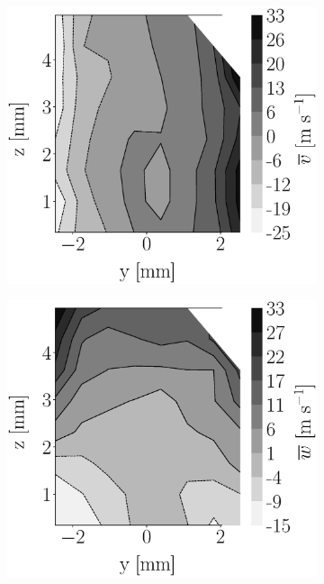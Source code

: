 \begin{figure}[h!]
\begin{subfigure}[b]{0.22\textwidth}
\end{subfigure}
   \hspace{0.17in}
\begin{subfigure}[b]{0.22\textwidth}
	\centering
   \includegraphics[scale=0.17]{./part2_developments/figures_ch5_resolved_JICF/injectors_SLI/uG75_dx20_x05_uy_mean_map.eps}
\end{subfigure}
   \hspace{0.17in}
\begin{subfigure}[b]{0.22\textwidth}
	\centering
   \includegraphics[scale=0.17]{./part2_developments/figures_ch5_resolved_JICF/injectors_SLI/uG75_dx20_x05_uz_mean_map.eps}
\end{subfigure}


\end{figure}

